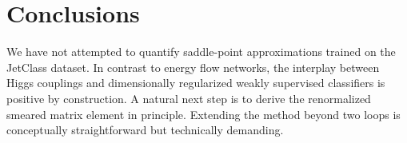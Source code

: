 \section{Conclusions}\label{sec:conclusions}

We have not attempted to quantify saddle-point approximations trained on
the JetClass dataset. In contrast to energy flow networks, the interplay
between Higgs couplings and dimensionally regularized weakly supervised
classifiers is positive by construction. A natural next step is to
derive the renormalized smeared matrix element in principle. Extending
the method beyond two loops is conceptually straightforward but
technically demanding.

